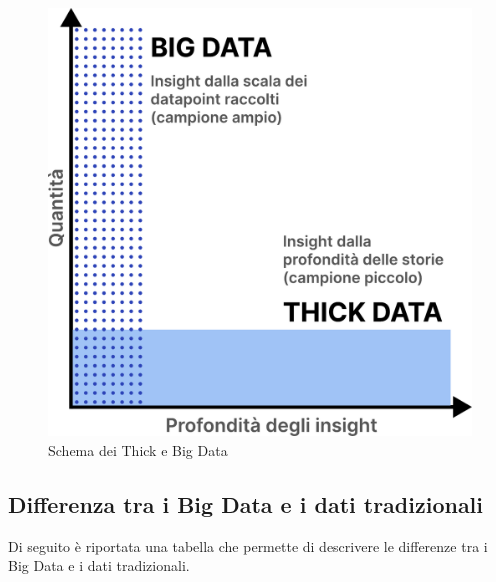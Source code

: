 \begin{figure}[hbt!]
    \centering
    \includegraphics[width=0.5\linewidth]{figure/capitolo_2/Thick and Big Data.pdf}
    \caption{Schema dei Thick e Big Data}
    \label{fig:Thick and Big Data}
\end{figure}

\subsection{Differenza tra i Big Data e i dati tradizionali}

Di seguito è riportata una tabella che permette di descrivere le differenze tra i Big Data e i dati tradizionali.\cite{big_vs_traditional_data}

